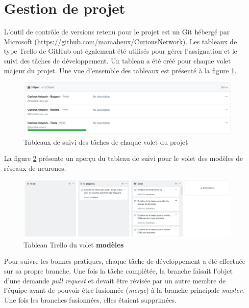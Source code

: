 \section{Gestion de projet}
    L'outil de contrôle de versions retenu pour le projet est un Git hébergé par Microsoft (\url{https://github.com/mamaheux/CuriousNetwork}). Les tableaux de type Trello de GitHub ont également été utilisés pour gérer l'assignation et le suivi des tâches de développement. Un tableau a été créé pour chaque volet majeur du projet. Une vue d'ensemble des tableaux est présenté à la figure \ref{fig:trello_boards}.

    \begin{figure}[H]
        \centering
        \includegraphics[width=15cm]{images/3_sub_projects.png}
        \caption{Tableaux de suivi des tâches de chaque volet du projet}
        \label{fig:trello_boards}
    \end{figure}

    La figure \ref{fig:trello_board_models} présente un aperçu du tableau de suivi pour le volet des modèles de réseaux de neurones.
    \begin{figure}[H]
        \centering
        \includegraphics[width=15cm]{images/trello_board.png}
        \caption{Tableau Trello du volet \textbf{modèles}}
        \label{fig:trello_board_models}
    \end{figure}

    Pour suivre les bonnes pratiques, chaque tâche de développement a été effectuée sur sa propre branche. Une fois la tâche complétée, la branche faisait l'objet d'une demande \textit{pull request} et devait être révisée par un autre membre de l'équipe avant de pouvoir être fusionnée (\textit{merge}) à la branche principale \textit{master}. Une fois les branches fusionnées, elles étaient supprimées.\\
    
